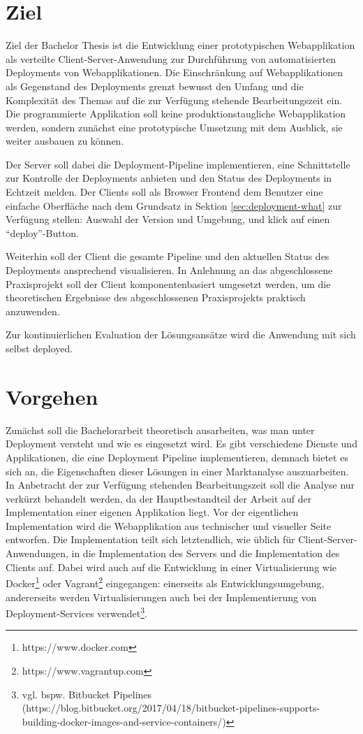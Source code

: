 \documentclass{scrartcl}
\begin{document}
\section{Ziel}
\label{sec:ziel}

Ziel der Bachelor Thesis ist die Entwicklung einer prototypischen Webapplikation als verteilte Client-Server-Anwendung zur Durchführung von automatisierten Deployments von Webapplikationen. Die Einschränkung auf Webapplikationen als Gegenstand des Deployments grenzt bewusst den Umfang und die Komplexität des Themas auf die zur Verfügung stehende Bearbeitungszeit ein. Die programmierte Applikation soll keine produktionstaugliche Webapplikation werden, sondern zunächst eine prototypische Umsetzung mit dem Ausblick, sie weiter ausbauen zu können.

Der Server soll dabei die Deployment-Pipeline implementieren, eine Schnittstelle zur Kontrolle der Deployments anbieten und den Status des Deployments in Echtzeit melden. Der Clients soll als Browser Frontend dem Benutzer eine einfache Oberfläche nach dem Grundsatz in Sektion \ref{sec:deployment-what} zur Verfügung stellen: Auswahl der Version und Umgebung, und klick auf einen ``deploy''-Button.

Weiterhin soll der Client die gesamte Pipeline und den aktuellen Status des Deployments ansprechend visualisieren. In Anlehnung an das abgeschlossene Praxisprojekt soll der Client komponentenbasiert umgesetzt werden, um die theoretischen Ergebnisse des abgeschlossenen Praxisprojekts praktisch anzuwenden.

Zur kontinuierlichen Evaluation der Lösungsansätze wird die Anwendung mit sich selbst deployed.

\section{Vorgehen}
\label{sec:vorgehen}

Zunächst soll die Bachelorarbeit theoretisch ausarbeiten, was man unter Deployment versteht und wie es eingesetzt wird. Es gibt verschiedene Dienste und Applikationen, die eine Deployment Pipeline implementieren, demnach bietet es sich an, die Eigenschaften dieser Lösungen in einer Marktanalyse auszuarbeiten. In Anbetracht der zur Verfügung stehenden Bearbeitungszeit soll die Analyse nur verkürzt behandelt werden, da der Hauptbestandteil der Arbeit auf der Implementation einer eigenen Applikation liegt. Vor der eigentlichen Implementation wird die Webapplikation aus technischer und visueller Seite entworfen. Die Implementation teilt sich letztendlich, wie üblich für Client-Server-Anwendungen, in die Implementation des Servers und die Implementation des Clients auf. Dabei wird auch auf die Entwicklung in einer Virtualisierung wie Docker\footnote{https://www.docker.com} oder Vagrant\footnote{https://www.vagrantup.com} eingegangen: einerseits als Entwicklungsumgebung, andererseits werden Virtualisierungen auch bei der Implementierung von Deployment-Services verwendet\footnote{vgl. bspw. Bitbucket Pipelines (https://blog.bitbucket.org/2017/04/18/bitbucket-pipelines-supports-building-docker-images-and-service-containers/)}.
\end{document}
